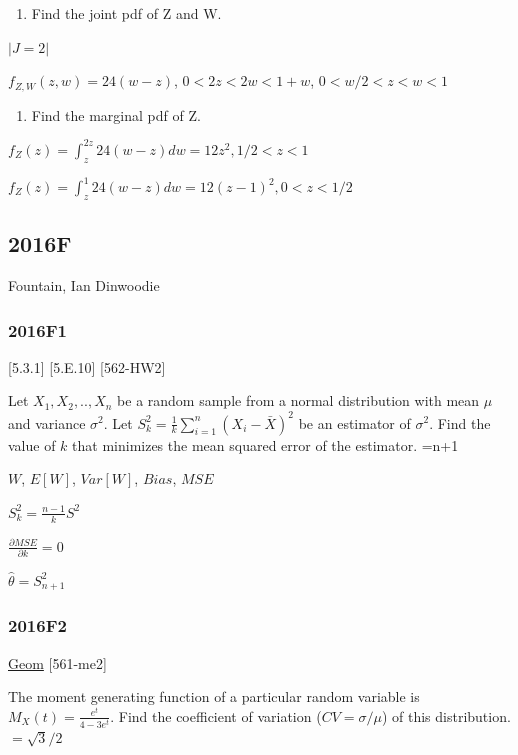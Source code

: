 \documentclass[10pt,twocolumn,portrait]{article}
\providecommand{\tightlist}{%
  \setlength{\itemsep}{0pt}\setlength{\parskip}{0pt}}
\begin{document}
\begin{enumerate}
\def\labelenumi{(\alph{enumi})}
\tightlist
\item
  Find the joint pdf of Z and W.
\end{enumerate}

\(|J=2|\)

\(f_{Z,W}(z,w)=24(w-z)\), \(0<2z<2w<1+w\), \(0<w/2<z<w<1\)

\begin{enumerate}
\def\labelenumi{(\alph{enumi})}
\setcounter{enumi}{1}
\tightlist
\item
  Find the marginal pdf of Z.
\end{enumerate}

\(f_{Z}(z)=\int_{z}^{2z}24(w-z)dw=12z^2, 1/2<z<1\)

\(f_{Z}(z)=\int_{z}^{1}24(w-z)dw=12(z-1)^2, 0<z<1/2\)

\hypertarget{f-11}{%
\subsection{2016F}\label{f-11}}

Fountain, Ian Dinwoodie

\hypertarget{f1-6}{%
\subsubsection{2016F1}\label{f1-6}}

{[}5.3.1{]}\protect\hyperlink{section}{}
{[}5.E.10{]}\protect\hyperlink{section}{} {[}562-HW2{]}

Let \(X_1,X_2,..,X_n\) be a random sample from a normal distribution
with mean \(\mu\) and variance \(\sigma^2\). Let
\(S_k^2=\frac1k\sum_{i=1}^n(X_i-\bar X)^2\) be an estimator of
\(\sigma^2\). Find the value of \(k\) that minimizes the mean squared
error of the estimator. =n+1

\(W\), \(E[W]\), \(Var[W]\), \(Bias\), \(MSE\)

\(S_k^2=\frac{n-1}{k}S^2\)

\(\frac{\partial MSE}{\partial k}=0\)

\(\hat\theta=S_{n+1}^2\)

\hypertarget{f2-6}{%
\subsubsection{2016F2}\label{f2-6}}

\protect\hyperlink{Geom}{Geom} {[}561-me2{]}

The moment generating function of a particular random variable is
\(M_X(t)=\frac{e^t}{4-3e^t}\). Find the coefficient of variation
(\(CV=\sigma/\mu\)) of this distribution. \(=\sqrt3/2\)
\end{document}
